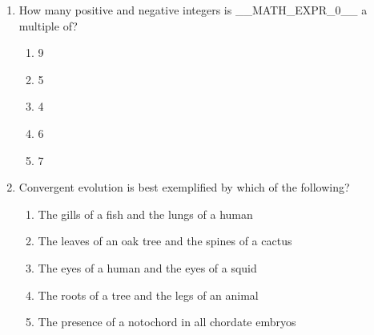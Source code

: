 \documentclass[12pt]{article}
\begin{document}
\begin{enumerate}[label=\arabic*.]
\begin{enumerate}[label=(\alph*)]
    \item 14
    \item 21
    \item 7
    \item 28
    \item 16
\end{enumerate}
\item How many positive and negative integers is \_\_MATH\_EXPR\_0\_\_ a multiple of?
\begin{enumerate}[label=(\alph*)]
    \item 9
    \item 5
    \item 4
    \item 6
    \item 7
\end{enumerate}
\item Convergent evolution is best exemplified by which of the following?
\begin{enumerate}[label=(\alph*)]
    \item The gills of a fish and the lungs of a human
    \item The leaves of an oak tree and the spines of a cactus
    \item The eyes of a human and the eyes of a squid
    \item The roots of a tree and the legs of an animal
    \item The presence of a notochord in all chordate embryos
\end{enumerate}
\end{enumerate}
\end{document}
